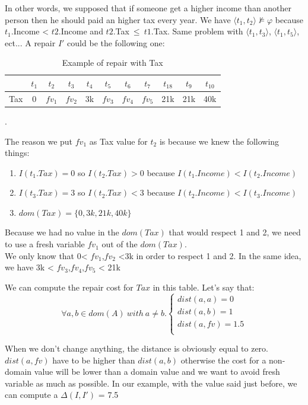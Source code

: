 \documentclass[letterpaper, 12pt]{report}
\begin{document}
In other words, we supposed that if someone get a higher income than another person then he should paid an higher tax every year. We have $ \langle t_1,t_2 \rangle \not\models \varphi $ because $t_1$.Income < $t2.$Income and $t2$.Tax$\ \leq\ t1$.Tax. Same problem with $ \langle t_1,t_3 \rangle$, $ \langle t_1,t_5 \rangle$, ect... A repair $I'$ could be the following one:

\begin{table}[H]
	\centering
	\begin{tabular}{|c|c c c c c c c c c c|}
	\hline
	   & $t_1$ & $t_2$ & $t_3$ &$t_4$ &$t_5$ &$t_6$ &$t_7$ &$t_18$ &$t_9$ &$t_10$ \\
	\hline
	 Tax & 0 & \color{red} $fv_1$ & \color{red} $fv_2$& 3k & \color{orange}$fv_3$& \color{orange} $fv_4$& \color{orange} $fv_5$& 21k & 21k & 40k\\
	 \hline
	\end{tabular}
	\caption{\label{tableExample} Example of repair with Tax}.
\end{table}

The reason we put $fv_1$ as Tax value for $t_2$ is because we knew the following things:
\begin{enumerate}

\item $I(t_1.Tax)=0$ so $I(t_2.Tax)>0$ because $I(t_1.Income)<I(t_2.Income)$
\item $I(t_3.Tax)=3$ so $I(t_2.Tax)<3$ because $I(t_2.Income)<I(t_3.Income)$
\item $dom(Tax) = \{0,3k,21k,40k\}$

\end{enumerate}
Because we had no value in the $dom(Tax)$ that would respect 1 and 2, we need to use a fresh variable $fv_1$ out of the $dom(Tax)$.\\
We only know that 0< $fv_1$,$fv_2$ <3k in order to respect 1 and 2. In the same idea, we have 3k < $fv_3$,$fv_4$,$fv_5$ < 21k

We can compute the repair cost for $Tax$ in this table. Let's say that:\\

$$
\forall a,b \in dom(A) \ with \ a \neq b.
\left\{
	\begin{array}{ll}
	   dist(a,a)=0\\
	   dist(a,b)=1\\
	   dist(a,fv)=1.5\\
	\end{array}
\right.
$$

When we don't change anything, the distance is obviously equal to zero. $dist(a,fv)$ have to be higher than $dist(a,b)$ otherwise the cost for a non-domain value will be lower than a domain value and we want to avoid fresh variable as much as possible. In our example, with the value said just before, we can compute a $\Delta(I,I')$ = 7.5
\end{document}
